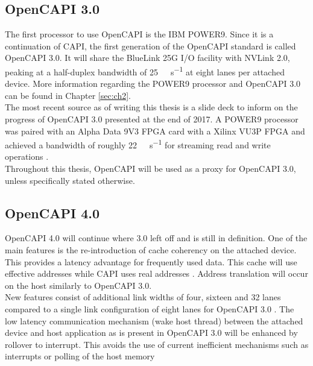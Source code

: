 \subsection{OpenCAPI 3.0}
The first processor to use OpenCAPI is the IBM POWER9. Since it is a continuation of CAPI, the first generation of the OpenCAPI standard is called OpenCAPI 3.0. It will share the BlueLink 25G I/O facility with NVLink 2.0, peaking at a half-duplex bandwidth of \SI{25}{\giga\bit\per\second} at eight lanes per attached device. More information regarding the POWER9 processor and OpenCAPI 3.0 can be found in Chapter \ref{sec:ch2}.\\
The most recent source as of writing this thesis is a slide deck to inform on the progress of OpenCAPI 3.0 presented at the end of 2017. A POWER9 processor was paired with an Alpha Data 9V3 FPGA card with a Xilinx VU3P FPGA and achieved a bandwidth of roughly \SI{22}{\giga\byte\per\second} for streaming read and write operations \cite{opencapi-enablement}.\\
Throughout this thesis, OpenCAPI will be used as a proxy for OpenCAPI 3.0, unless specifically stated otherwise.




\subsection{OpenCAPI 4.0}

OpenCAPI 4.0 will continue where 3.0 left off and is still in definition. One of the main features is the re-introduction of cache coherency on the attached device. This provides a latency advantage for frequently used data. This cache will use effective addresses while CAPI uses real addresses \cite{opencapi-enablement}. Address translation will occur on the host similarly to OpenCAPI 3.0.\\
New features consist of additional link widths of four, sixteen and 32 lanes compared to a single link configuration of eight lanes for OpenCAPI 3.0 \cite{opencapi-forum}. The low latency communication mechanism (wake host thread) between the attached device and host application as is present in OpenCAPI 3.0 will be enhanced by rollover to interrupt. This avoids the use of current inefficient mechanisms such as interrupts or polling of the host memory


